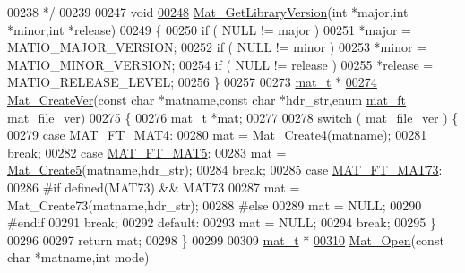 \begin{DoxyCode}
{{{{{{{{{{{{{{{{00238 \textcolor{comment}{ */}
00239 
00247 \textcolor{keywordtype}{void}
\hyperlink{mat_8c_a2069c4f0d1106778b56216ff4f95f94b}{00248} \hyperlink{mat_8c_a2069c4f0d1106778b56216ff4f95f94b}{Mat\_GetLibraryVersion}(\textcolor{keywordtype}{int} *major,\textcolor{keywordtype}{int} *minor,\textcolor{keywordtype}{int} *release)
00249 \{
00250     \textcolor{keywordflow}{if} ( NULL != major )
00251         *major = MATIO\_MAJOR\_VERSION;
00252     \textcolor{keywordflow}{if} ( NULL != minor )
00253         *minor = MATIO\_MINOR\_VERSION;
00254     \textcolor{keywordflow}{if} ( NULL != release )
00255         *release = MATIO\_RELEASE\_LEVEL;
00256 \}
00257 
00273 \hyperlink{struct__mat__t}{mat\_t} *
\hyperlink{group___m_a_t_ga22d404f203af7869c841400e7ad247cf}{00274} \hyperlink{group___m_a_t_ga22d404f203af7869c841400e7ad247cf}{Mat\_CreateVer}(\textcolor{keyword}{const} \textcolor{keywordtype}{char} *matname,\textcolor{keyword}{const} \textcolor{keywordtype}{char} *hdr\_str,\textcolor{keyword}{enum} \hyperlink{group___m_a_t_gad03442b8378999189d510e3745c702b7}{mat\_ft} mat\_file\_ver)
00275 \{
00276     \hyperlink{struct__mat__t}{mat\_t} *mat;
00277 
00278     \textcolor{keywordflow}{switch} ( mat\_file\_ver ) \{
00279         \textcolor{keywordflow}{case} \hyperlink{group___m_a_t_ggad03442b8378999189d510e3745c702b7a858b4f5da65548219b1c3ad47aa478d3}{MAT\_FT\_MAT4}:
00280             mat = \hyperlink{mat4_8c_aa819b0bf76cab52a202742dd4102c18d}{Mat\_Create4}(matname);
00281             \textcolor{keywordflow}{break};
00282         \textcolor{keywordflow}{case} \hyperlink{group___m_a_t_ggad03442b8378999189d510e3745c702b7a31ade1f6989411dc0299007e2c7d33b2}{MAT\_FT\_MAT5}:
00283             mat = \hyperlink{mat5_8c_aacff52cdf3427b35a54c111fa3d7bb21}{Mat\_Create5}(matname,hdr\_str);
00284             \textcolor{keywordflow}{break};
00285         \textcolor{keywordflow}{case} \hyperlink{group___m_a_t_ggad03442b8378999189d510e3745c702b7a765c5d1d5038947646260dc82483517e}{MAT\_FT\_MAT73}:
00286 \textcolor{preprocessor}{#if defined(MAT73) && MAT73}
00287             mat = Mat\_Create73(matname,hdr\_str);
00288 \textcolor{preprocessor}{#else}
00289             mat = NULL;
00290 \textcolor{preprocessor}{#endif}
00291             \textcolor{keywordflow}{break};
00292         \textcolor{keywordflow}{default}:
00293             mat = NULL;
00294             \textcolor{keywordflow}{break};
00295     \}
00296 
00297     \textcolor{keywordflow}{return} mat;
00298 \}
00299 
00309 \hyperlink{struct__mat__t}{mat\_t} *
\hyperlink{group___m_a_t_gafbfedb5636a99f0ef867520c47f77d18}{00310} \hyperlink{group___m_a_t_gafbfedb5636a99f0ef867520c47f77d18}{Mat\_Open}(\textcolor{keyword}{const} \textcolor{keywordtype}{char} *matname,\textcolor{keywordtype}{int} mode)
}}}}}}}}}}}}}}}}
\end{DoxyCode}
